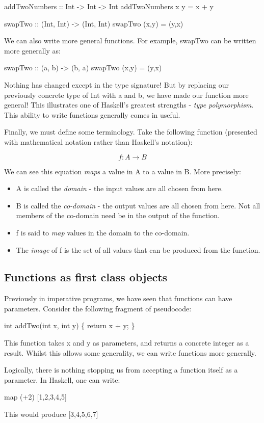\documentclass[../alevelcs.tex]{subfiles}
\begin{document}
	addTwoNumbers :: Int -> Int -> Int
	addTwoNumbers x y = x + y

	swapTwo :: (Int, Int) -> (Int, Int)
	swapTwo (x,y) = (y,x)

	We can also write more general functions. For example, swapTwo can be written more generally as:

	swapTwo :: (a, b) -> (b, a)
	swapTwo (x,y) = (y,x)

	Nothing has changed except in the type signature! But by replacing our previously concrete type of Int with a and b, we have made our function more general! This illustrates one of Haskell's greatest strengths - \textit{type polymorphism}. This ability to write functions generally comes in useful.

	Finally, we must define some terminology. Take the following function (presented with mathematical notation rather than Haskell's notation):

	\begin{equation}
		f: A \rightarrow B
	\end{equation}

	We can see this equation \textit{maps} a value in A to a value in B. More precisely:

	\begin{itemize}
		\item A is called the \textit{domain} - the input values are all chosen from here.
		\item B is called the \textit{co-domain} - the output values are all chosen from here. Not all members of the co-domain need be in the output of the function.
		\item f is said to \textit{map} values in the domain to the co-domain.
		\item The \textit{image} of f is the set of all values that can be produced from the function.
	\end{itemize}

	\subsection{Functions as first class objects}
	Previously in imperative programs, we have seen that functions can have parameters. Consider the following fragment of pseudocode:


			int addTwo(int x, int y) \{
				return x + y;
			\}
	
	This function takes x and y as parameters, and returns a concrete integer as a result. Whilst this allows some generality, we can write functions more generally.

	Logically, there is nothing stopping us from accepting a function itself as a parameter. In Haskell, one can write:

	
	map (+2) [1,2,3,4,5]
	
	This would produce [3,4,5,6,7]
	
\end{document}
